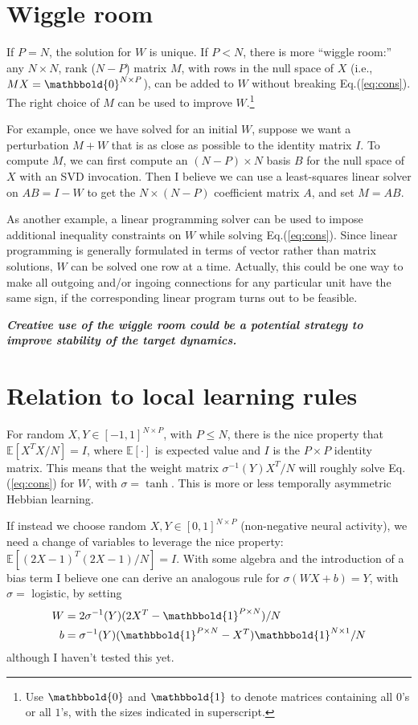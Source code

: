 \documentclass[pdftex,12pt,letterpaper]{article}
\begin{document}
\section{Wiggle room}

If $P=N$, the solution for $W$ is unique.  If $P<N$, there is more ``wiggle room:'' any $N\times N$, rank ($N-P$) matrix $M$, with rows in the null space of $X$ (i.e., $MX = \mathbbold{0}^{N\times P}$), can be added to $W$ without breaking Eq.\@ (\ref{eq:cons}).  The right choice of $M$ can be used to improve $W$.\footnote{Use $\mathbbold{0}$ and $\mathbbold{1}$ to denote matrices containing all $0$'s or all $1$'s, with the sizes indicated in superscript.}

For example, once we have solved for an initial $W$, suppose we want a perturbation $M+W$ that is as close as possible to the identity matrix $I$.  To compute $M$, we can first compute an $(N-P)\times N$ basis $B$ for the null space of $X$ with an SVD invocation.  Then I believe we can use a least-squares linear solver on $AB = I-W$ to get the $N\times (N-P)$ coefficient matrix $A$, and set $M = AB$.

As another example, a linear programming solver can be used to impose additional inequality constraints on $W$ while solving Eq.\@ (\ref{eq:cons}).  Since linear programming is generally formulated in terms of vector rather than matrix solutions, $W$ can be solved one row at a time.  Actually, this could be one way to make all outgoing and/or ingoing connections for any particular unit have the same sign, if the corresponding linear program turns out to be feasible.

\textbf{\textit{Creative use of the wiggle room could be a potential strategy to improve stability of the target dynamics.}}

\section{Relation to local learning rules}

For random $X, Y \in [-1,1]^{N\times P}$, with $P \leq N$, there is the nice property that $\mathbb{E}[X^TX/N] = I$, where $\mathbb{E}[\cdot]$ is expected value and $I$ is the $P\times P$ identity matrix.  This means that the weight matrix $\sigma^{-1}(Y)X^T/N$ will roughly solve Eq.\@ (\ref{eq:cons}) for $W$, with $\sigma = \tanh$.  This is more or less temporally asymmetric Hebbian learning.

If instead we choose random $X, Y\in [0,1]^{N\times P}$ (non-negative neural activity), we need a change of variables to leverage the nice property: $\mathbb{E}[(2X-1)^T(2X-1)/N] = I$.  With some algebra and the introduction of a bias term I believe one can derive an analogous rule for $\sigma(WX + b) = Y$, with $\sigma =$ logistic, by setting
\begin{align}
W &= 2\sigma^{-1}(Y)(2X^T - \mathbbold{1}^{P\times N})/N \\
b &=  \sigma^{-1}(Y)(\mathbbold{1}^{P\times N} - X^T)\mathbbold{1}^{N\times 1}/N
\end{align}
although I haven't tested this yet.
\end{document}
